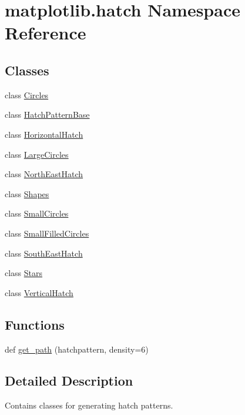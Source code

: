 \hypertarget{namespacematplotlib_1_1hatch}{}\section{matplotlib.\+hatch Namespace Reference}
\label{namespacematplotlib_1_1hatch}
\subsection*{Classes}
\begin{DoxyCompactItemize}
\item 
class \hyperlink{classmatplotlib_1_1hatch_1_1Circles}{Circles}
\item 
class \hyperlink{classmatplotlib_1_1hatch_1_1HatchPatternBase}{Hatch\+Pattern\+Base}
\item 
class \hyperlink{classmatplotlib_1_1hatch_1_1HorizontalHatch}{Horizontal\+Hatch}
\item 
class \hyperlink{classmatplotlib_1_1hatch_1_1LargeCircles}{Large\+Circles}
\item 
class \hyperlink{classmatplotlib_1_1hatch_1_1NorthEastHatch}{North\+East\+Hatch}
\item 
class \hyperlink{classmatplotlib_1_1hatch_1_1Shapes}{Shapes}
\item 
class \hyperlink{classmatplotlib_1_1hatch_1_1SmallCircles}{Small\+Circles}
\item 
class \hyperlink{classmatplotlib_1_1hatch_1_1SmallFilledCircles}{Small\+Filled\+Circles}
\item 
class \hyperlink{classmatplotlib_1_1hatch_1_1SouthEastHatch}{South\+East\+Hatch}
\item 
class \hyperlink{classmatplotlib_1_1hatch_1_1Stars}{Stars}
\item 
class \hyperlink{classmatplotlib_1_1hatch_1_1VerticalHatch}{Vertical\+Hatch}
\end{DoxyCompactItemize}
\subsection*{Functions}
\begin{DoxyCompactItemize}
\item 
def \hyperlink{namespacematplotlib_1_1hatch_afa103984b79e9df2cd8a6a5d5f923b0b}{get\+\_\+path} (hatchpattern, density=6)
\end{DoxyCompactItemize}


\subsection{Detailed Description}
\begin{DoxyVerb}Contains classes for generating hatch patterns.\end{DoxyVerb}
 

